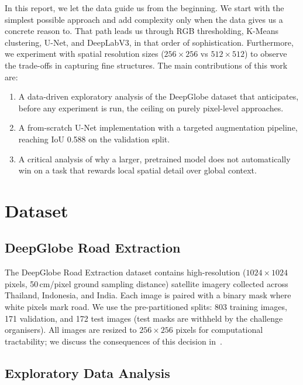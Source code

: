 \documentclass[conference]{IEEEtran}
\begin{document}
In this report, we let the data guide us from the beginning.
We start with the simplest possible approach and add complexity only when the data gives us a
concrete reason to.
That path leads us through RGB thresholding, K-Means clustering, U-Net, and DeepLabV3,
in that order of sophistication. Furthermore, we experiment with spatial resolution sizes ($256\times256$ vs $512\times512$) to observe the trade-offs in capturing fine structures.
The main contributions of this work are:
\begin{enumerate}
  \item A data-driven exploratory analysis of the DeepGlobe dataset that anticipates,
        before any experiment is run, the ceiling on purely pixel-level approaches.
  \item A from-scratch U-Net implementation with a targeted augmentation pipeline,
        reaching IoU 0.588 on the validation split.
  \item A critical analysis of why a larger, pretrained model does not automatically win
        on a task that rewards local spatial detail over global context.
\end{enumerate}

\section{Dataset}
\label{sec:data}

\subsection{DeepGlobe Road Extraction}

The DeepGlobe Road Extraction dataset \cite{demir2018deepglobe} contains high-resolution
($1024 \times 1024$ pixels, 50\,cm/pixel ground sampling distance) satellite imagery collected
across Thailand, Indonesia, and India.
Each image is paired with a binary mask where white pixels mark road.
We use the pre-partitioned splits: 803 training images, 171 validation, and 172 test images
(test masks are withheld by the challenge organisers).
All images are resized to $256 \times 256$ pixels for computational tractability;
we discuss the consequences of this decision in~.

\subsection{Exploratory Data Analysis}
\label{sec:eda}
\end{document}
